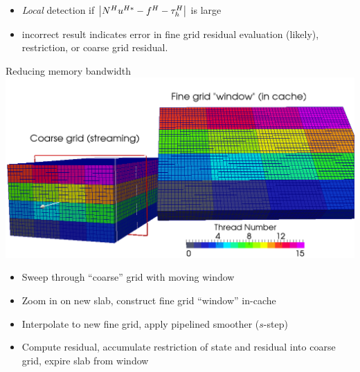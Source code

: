 \documentclass{beamer}
\newcommand{\mglevel}{\ensuremath{\ell}}
\begin{document}
\begin{frame}[fragile]
\begin{figure}
  \end{figure}
  \begin{itemize}
  \item \emph{Local} detection if $\left\lvert N^H u^{H*} - f^H - \tau_h^H \right\rvert$ is large
  \item incorrect result indicates error in fine grid residual evaluation (likely), restriction, or coarse grid residual.
  \end{itemize}
\end{frame}


\begin{frame}{Reducing memory bandwidth}
  \includegraphics[width=\textwidth]{figures/MG/SRMGWindow}
  \begin{itemize}
  \item Sweep through ``coarse'' grid with moving window
  \item Zoom in on new slab, construct fine grid ``window'' in-cache
  \item Interpolate to new fine grid, apply pipelined smoother ($s$-step)
  \item Compute residual, accumulate restriction of state and residual into coarse grid, expire slab from window
  \end{itemize}
\end{frame}
\end{document}
